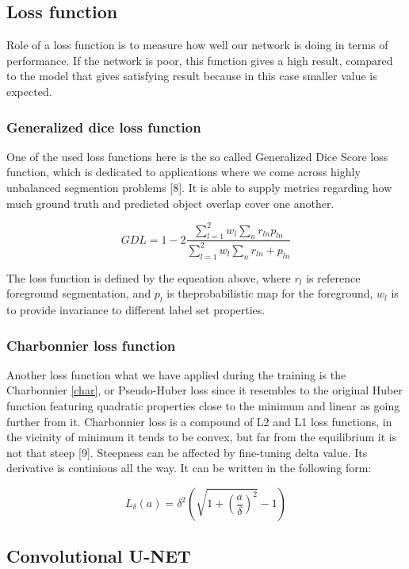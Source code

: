 \documentclass{article}
\begin{document}
\subsection{Loss function}
Role of a loss function is to measure how well our network is doing in terms of performance. If the network is poor, this function gives a high result, compared to the model that gives satisfying result because in this case smaller value is expected.
\subsubsection{Generalized dice loss function}
One of the used loss functions here is the so called Generalized Dice Score loss function, which is dedicated to applications where we come across 
highly unbalanced segmention problems [8]. It is able to supply metrics regarding how much ground truth and predicted object overlap cover one another.

\begin{equation}
\label{gdl}
GDL = 1-2\frac{\sum_{l=1}^{2}w_l\sum_{n}r_{ln}p_{ln}}{\sum_{l=1}^{2}w_l\sum_{n}r_{ln}+p_{ln}}
\end{equation} 

The loss function is defined by the equeation above, where $r_l$ is reference foreground segmentation, and $p_l$ is theprobabilistic map for the foreground, $w_l$ is to provide invariance to different label set properties.


\subsubsection{Charbonnier loss function}
Another loss function what we have applied during the training is the Charbonnier \ref{char}, or Pseudo-Huber loss since it resembles to the original Huber function featuring quadratic properties close to the minimum and linear as going further from it. Charbonnier loss is a compound of L2 and L1 loss functions, in the vicinity of minimum it tends to be convex, but far from the equilibrium it is not that steep [9]. Steepness can be affected by fine-tuning delta value. Its derivative is continious all the way.
It can be written in the following form:

\begin{equation}
\label{char}
L_\delta(a) = \delta^{2}(\sqrt{1+{(\frac{a}{\delta})^2}}-1)
\end{equation} 



\subsection{Convolutional U-NET}
\end{document}
